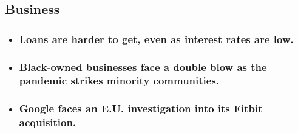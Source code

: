 \begin{itemize}
  \hypertarget{business}{%
  \subsection{Business}\label{business}}

  \begin{itemize}
  \item
    \href{https://www.nytimes.com/live/2020/08/04/business/stock-market-today-coronavirus?type=styln-live-updates\&label=business\&index=1\#loans-are-harder-to-get-even-as-interest-rates-are-low}{}

    \hypertarget{loans-are-harder-to-get-even-as-interest-rates-are-low}{%
    \subsubsection{Loans are harder to get, even as interest rates are
    low.}\label{loans-are-harder-to-get-even-as-interest-rates-are-low}}
  \item
    \href{https://www.nytimes.com/live/2020/08/04/business/stock-market-today-coronavirus?type=styln-live-updates\&label=business\&index=1\#black-owned-businesses-face-a-double-blow-as-the-pandemic-strikes-minority-communities}{}

    \hypertarget{black-owned-businesses-face-a-double-blow-as-the-pandemic-strikes-minority-communities}{%
    \subsubsection{Black-owned businesses face a double blow as the
    pandemic strikes minority
    communities.}\label{black-owned-businesses-face-a-double-blow-as-the-pandemic-strikes-minority-communities}}
  \item
    \href{https://www.nytimes.com/live/2020/08/04/business/stock-market-today-coronavirus?type=styln-live-updates\&label=business\&index=1\#google-faces-an-eu-investigation-into-its-fitbit-acquisition}{}

    \hypertarget{google-faces-an-eu-investigation-into-its-fitbit-acquisition}{%
    \subsubsection{Google faces an E.U. investigation into its Fitbit
    acquisition.}\label{google-faces-an-eu-investigation-into-its-fitbit-acquisition}}
  \end{itemize}
\end{itemize}

